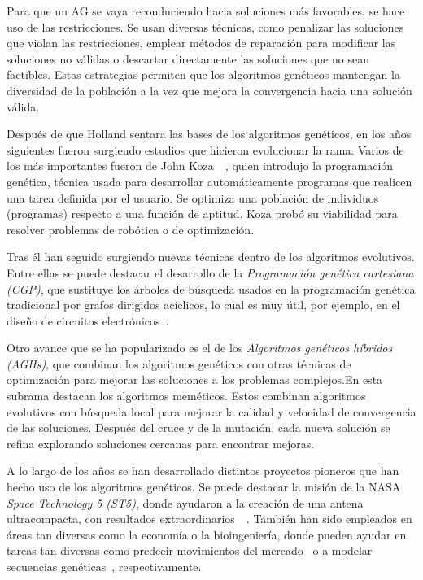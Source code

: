Para que un AG se vaya reconduciendo hacia soluciones más favorables, se hace uso de las restricciones. Se usan diversas técnicas, como penalizar las soluciones que violan las restricciones, emplear métodos de reparación para modificar las soluciones no válidas o descartar directamente las soluciones que no sean factibles. Estas estrategias permiten que los algoritmos genéticos mantengan la diversidad de la población a la vez que mejora la convergencia hacia una solución válida.

Después de que Holland sentara las bases de los algoritmos genéticos, en los años siguientes fueron surgiendo estudios que hicieron evolucionar la rama. Varios de los más importantes fueron de John Koza~\cite{koza1992}~\cite{koza1994}, quien introdujo la programación genética, técnica usada para desarrollar automáticamente programas que realicen una tarea definida por el usuario. Se optimiza una población de individuos (programas) respecto a una función de aptitud. Koza probó su viabilidad para resolver problemas de robótica o de optimización.

Tras él han seguido surgiendo nuevas técnicas dentro de los algoritmos evolutivos. Entre ellas se puede destacar el desarrollo de la \textit{Programación genética cartesiana (CGP)}, que sustituye los árboles de búsqueda usados en la programación genética tradicional por grafos dirigidos acíclicos, lo cual es muy útil, por ejemplo, en el diseño de circuitos electrónicos~\cite{miller1997}.

Otro avance que se ha popularizado es el de los \textit{Algoritmos genéticos híbridos (AGHs)}, que combinan los algoritmos genéticos con otras técnicas de optimización para mejorar las soluciones a los problemas complejos.\newpage En esta subrama destacan los algoritmos meméticos. Estos combinan algoritmos evolutivos con búsqueda local para mejorar la calidad y velocidad de convergencia de las soluciones. Después del cruce y de la mutación, cada nueva solución se refina explorando soluciones cercanas para encontrar mejoras.~\cite{moscato2003}

A lo largo de los años se han desarrollado distintos proyectos pioneros que han hecho uso de los algoritmos genéticos. Se puede destacar la misión de la NASA \textit{Space Technology 5 (ST5)}, donde ayudaron a la creación de una antena ultracompacta, con resultados extraordinarios~\cite{nasa2006}~\cite{lohn2004}. También han sido empleados en áreas tan diversas como la economía o la bioingeniería, donde pueden ayudar en tareas tan diversas como predecir movimientos del mercado~\cite{abraham2022} o a modelar secuencias genéticas~\cite{notredame1996}, respectivamente.

